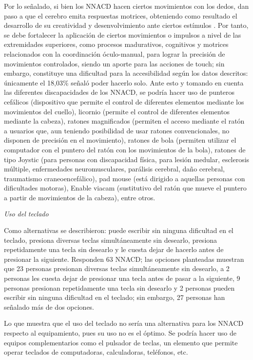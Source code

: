 \documentclass[spanish]{textolivre}
\begin{document}
Por lo señalado, si bien los NNACD hacen ciertos movimientos con los dedos, dan paso a que el cerebro emita respuestas motrices, obteniendo como resultado el desarrollo de su creatividad y desenvolvimiento ante ciertos estímulos \cite{puertas_motricidad_2017}. Por tanto, se debe fortalecer la aplicación de ciertos movimientos o impulsos a nivel de las extremidades superiores, como procesos madurativos, cognitivos y motrices relacionados con la coordinación óculo-manual, para lograr la precisión de movimientos controlados, siendo un aporte para las acciones de touch; sin embargo, constituye una dificultad para la accesibilidad según los datos descritos: únicamente el 18,03\% señaló poder hacerlo solo. Ante esto y tomando en cuenta las diferentes discapacidades de los NNACD, se podría hacer uso de punteros cefálicos (dispositivo que permite el control de diferentes elementos mediante los movimientos del cuello), licornio (permite el control de diferentes elementos mediante la cabeza), ratones magnificados (permiten el acceso mediante el ratón a usuarios que, aun teniendo posibilidad de usar ratones convencionales, no disponen de precisión en el movimiento), ratones de bola (permiten utilizar el computador con el puntero del ratón con los movimientos de la bola), ratones de tipo Joystic (para personas con discapacidad física, para lesión medular, esclerosis múltiple, enfermedades neuromusculares, parálisis cerebral, daño cerebral, traumatismo craneoencefálico), pad mouse (está dirigido a aquellas personas con dificultades motoras), Enable viacam (sustitutivo del ratón que mueve el puntero a partir de movimientos de la cabeza), entre otros.

\textit{Uso del teclado}

Como alternativas se describieron: puede escribir sin ninguna dificultad en el teclado, presiona diversas teclas simultáneamente sin desearlo, presiona repetidamente una tecla sin desearlo y le cuesta dejar de hacerlo antes de presionar la siguiente. Responden 63 NNACD; las opciones planteadas muestran que 23 personas presionan diversas teclas simultáneamente sin desearlo, a 2 personas les cuesta dejar de presionar una tecla antes de pasar a la siguiente, 9 personas presionan repetidamente una tecla sin desearlo y 2 personas pueden escribir sin ninguna dificultad en el teclado; sin embargo, 27 personas han señalado más de dos opciones.

Lo que muestra que el uso del teclado no sería una alternativa para los NNACD respecto al equipamiento, pues su uso no es el óptimo. Se podría hacer uso de equipos complementarios como el pulsador de teclas, un elemento que permite operar teclados de computadoras, calculadoras, teléfonos, etc.
\end{document}

